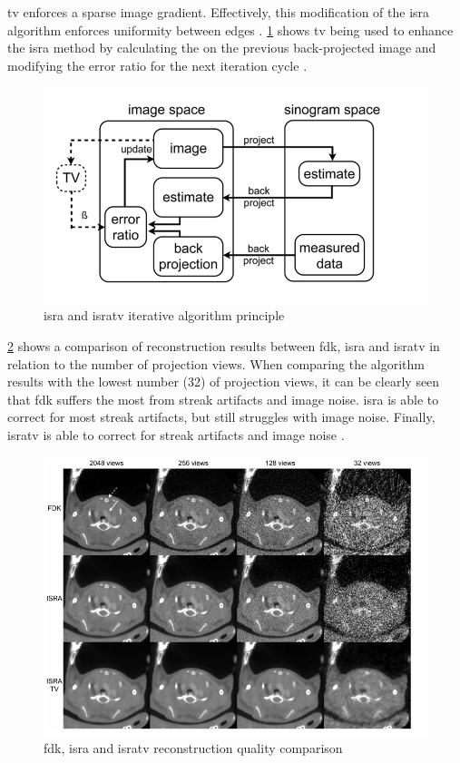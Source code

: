 \acrfull{tv} enforces a sparse image gradient.
Effectively, this modification of the \gls{isra} algorithm enforces uniformity between edges \cite{vandeghinsteLowDoseMicroCTImaging2013}.
\cref{fig:isra} shows \acrshort{tv} being used to enhance the \gls{isra} method by
calculating the  on the previous back-projected image and modifying the error ratio for the next iteration cycle \cite{vandeghinsteLowDoseMicroCTImaging2013}.
\begin{figure}[h]
	\centerline{
		\includegraphics[scale=0.5]{images/isra.png}}
	\caption{\gls{isra} and \gls{isratv} iterative algorithm principle \cite{vandeghinsteLowDoseMicroCTImaging2013}}\label{fig:isra}
\end{figure}

\noindent
\cref{fig:alg-comp} shows a comparison of reconstruction results between \gls{fdk}, \gls{isra} and \gls{isratv}
in relation to the number of projection views.
When comparing the algorithm results with the lowest number (32) of projection views,
it can be clearly seen that \gls{fdk} suffers the most from streak artifacts and image noise.
\gls{isra} is able to correct for most streak artifacts, but still struggles with image noise.
Finally, \gls{isratv} is able to correct for streak artifacts and image noise \cite{vandeghinsteLowDoseMicroCTImaging2013}.
\begin{figure}[h]
	\centerline{
		\includegraphics[scale=0.5]{images/alg-comp.png}}
	\caption{\gls{fdk}, \gls{isra} and \gls{isratv} reconstruction quality comparison \cite{vandeghinsteLowDoseMicroCTImaging2013}}\label{fig:alg-comp}
\end{figure}


